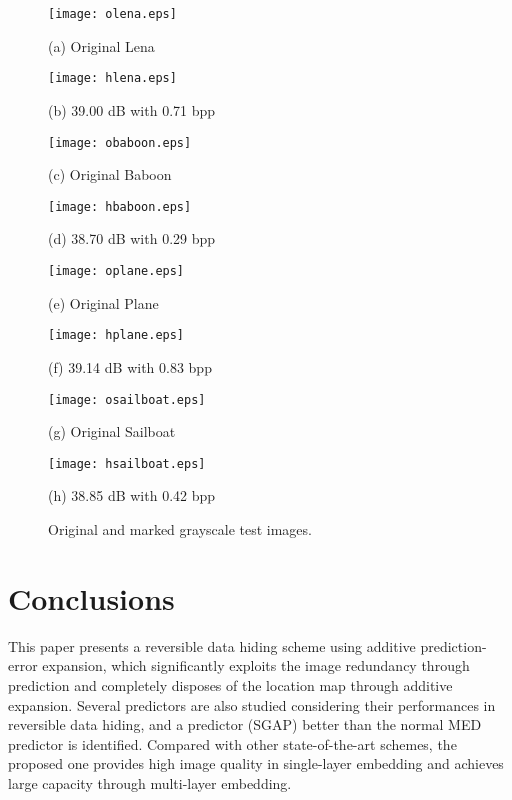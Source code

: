 \documentclass{sig-alternate}
\begin{document}
\begin{figure*}[t]
  \begin{minipage}[t]{.24\linewidth}
    \centering
    \texttt{[image: olena.eps]}
    \centerline{(a) Original Lena}\medskip
  \end{minipage}
  \hfill
  \begin{minipage}[t]{0.24\linewidth}
    \centering
    \texttt{[image: hlena.eps]}
    \centerline{(b) 39.00 dB with 0.71 bpp}\medskip
  \end{minipage}
  \hfill
  \begin{minipage}[t]{.24\linewidth}
    \centering
    \texttt{[image: obaboon.eps]}
    \centerline{(c) Original Baboon}\medskip
  \end{minipage}
  \hfill
  \begin{minipage}[t]{0.24\linewidth}
    \centering
    \texttt{[image: hbaboon.eps]}
    \centerline{(d) 38.70 dB with 0.29 bpp }\medskip
  \end{minipage}

  \begin{minipage}[b]{.24\linewidth}
    \centering
    \texttt{[image: oplane.eps]}
    \centerline{(e) Original Plane}\medskip
  \end{minipage}
  \hfill
  \begin{minipage}[b]{0.24\linewidth}
    \centering
    \texttt{[image: hplane.eps]}
    \centerline{(f) 39.14 dB with 0.83 bpp}\medskip
  \end{minipage}
  \hfill
  \begin{minipage}[b]{.24\linewidth}
    \centering
    \texttt{[image: osailboat.eps]}
    \centerline{(g) Original Sailboat}\medskip
  \end{minipage}
  \hfill
  \begin{minipage}[b]{0.24\linewidth}
    \centering
    \texttt{[image: hsailboat.eps]}
    \centerline{(h) 38.85 dB with 0.42 bpp }\medskip
  \end{minipage}

  \caption{\label{fig:images}Original and marked grayscale test images.}
\end{figure*}

\section{Conclusions}\label{sec:conclude}
This paper presents a reversible data hiding scheme using additive prediction-error expansion, which
significantly exploits the image redundancy through prediction and completely disposes of the
location map through additive expansion. Several predictors are also studied considering their
performances in reversible data hiding, and a predictor (SGAP) better than the normal MED predictor
is identified. Compared with other state-of-the-art schemes, the proposed one provides high image
quality in single-layer embedding and achieves large capacity through multi-layer embedding.
\end{document}
